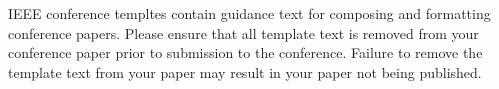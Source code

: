 \documentclass[conference]{IEEEtran}
\begin{document}
\vspace{12pt}
\color{red}
IEEE conference templtes contain guidance text for composing and formatting conference papers. Please ensure that all template text is removed from your conference paper prior to submission to the conference. Failure to remove the template text from your paper may result in your paper not being published.
\end{document}
